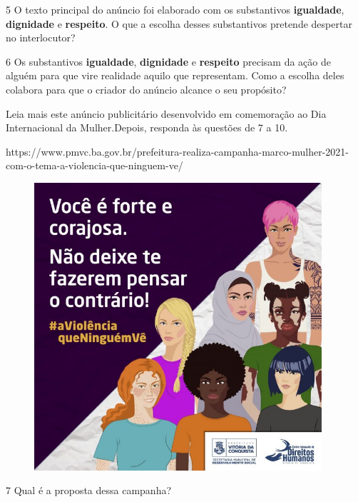 \begin{itemize}
\begin{itemize}
{\begin{itemize}
\begin{itemize}
\num{5} O texto principal do anúncio foi elaborado com os substantivos
\textbf{igualdade}, \textbf{dignidade} e \textbf{respeito}. O que a
escolha desses substantivos pretende despertar no interlocutor?

\num{6} Os substantivos \textbf{igualdade}, \textbf{dignidade} e
\textbf{respeito} precisam da ação de alguém para que vire realidade
aquilo que representam. Como a escolha deles colabora para que o criador
do anúncio alcance o seu propósito? 

Leia mais este anúncio publicitário desenvolvido em comemoração ao Dia
Internacional da Mulher.Depois, responda às questões de 7 a 10.

https://www.pmvc.ba.gov.br/prefeitura-realiza-campanha-marco-mulher-2021-com-o-tema-a-violencia-que-ninguem-ve/

\begin{figure}
\centering
\includegraphics[width=4.19722in,height=4.19722in]{./_SAEB_9_POR/media/image21.jpeg}
\caption{}
\end{figure}

\num{7} Qual é a proposta dessa campanha? 


\end{itemize}
\end{itemize}}
\end{itemize}
\end{itemize}
